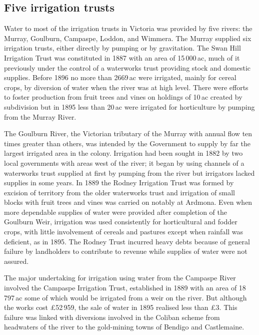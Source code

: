 \subsection*{Five irrigation trusts}

Water to most of the irrigation trusts in Victoria was provided by
five rivers: the Murray, Goulburn, Campaspe, Loddon, and Wimmera.  The
Murray supplied six irrigation trusts, either directly by pumping or
by gravitation.  The Swan Hill Irrigation Trust was constituted in
1887 with an area of 15\,000\,ac, much of it previously under the
control of a waterworks trust providing stock and domestic supplies.
Before 1896 no more than 2669\,ac were irrigated, main\-ly for cereal
crops, by diversion of water when the river was at high level. There
were efforts to foster production from fruit trees and vines on
holdings of 10\,ac created by subdivision but in 1895 less than 20\,ac
were irrigated for horticulture by pumping from the Murray
River.

The Goulburn River, the Victorian tributary of the Murray with annual
flow ten times greater than others, was intended by the Government to
supply by far the largest irrigated area in the colony.  Irrigation
had been sought in 1882 by two local governments with areas west of
the river; it began by using channels of a waterworks trust supplied
at first by pumping from the river but irrigators lacked supplies in
some years.  In 1889 the Rodney Irrigation Trust was formed by
excision of territory from the older waterworks trust and irrigation
of small blocks with fruit trees and vines was carried on notably at
Ardmona.  Even when more dependable supplies of water were provided
after completion of the Goulburn Weir, irrigation was used
consistently for horticultural and fodder crops, with little
involvement of cereals and pastures except when rainfall was
deficient, as in 1895.  The Rodney Trust incurred heavy debts because
of general failure by landholders to contribute to revenue while
supplies of water were not assured.

The major undertaking for irrigation using water from the Campaspe
River involved the Campaspe Irrigation Trust, established in 1889 with
an area of 18\,797\,ac some of which would be irrigated from a weir on
the river.  But although the works cost \pounds52\,959, the sale of
water in 1895 realised less than \pounds3. This failure was linked
with diversions involved in the Coliban scheme from headwaters of the
river to the gold-mining towns of Bendigo and Castlemaine.

